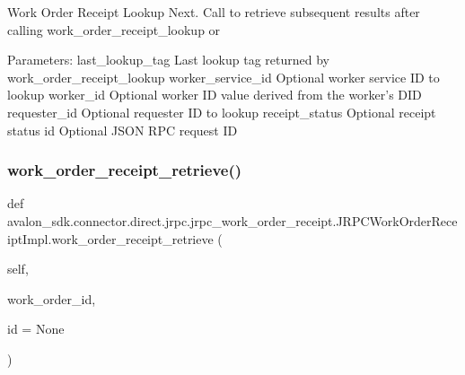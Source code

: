 \begin{DoxyVerb}Work Order Receipt Lookup Next.
Call to retrieve subsequent results after calling
work_order_receipt_lookup or

Parameters:
last_lookup_tag          Last lookup tag returned by
                 work_order_receipt_lookup
worker_service_id        Optional worker service ID to lookup
worker_id                Optional worker ID value derived from
                 the worker's DID
requester_id             Optional requester ID to lookup
receipt_status           Optional receipt status
id                       Optional JSON RPC request ID
\end{DoxyVerb}
 \mbox{\label{classavalon__sdk_1_1connector_1_1direct_1_1jrpc_1_1jrpc__work__order__receipt_1_1JRPCWorkOrderReceiptImpl_ad4a088c0a4999994ff61ae696b9b4c4c}} 
\subsubsection{\texorpdfstring{work\+\_\+order\+\_\+receipt\+\_\+retrieve()}{work\_order\_receipt\_retrieve()}}
{\footnotesize\ttfamily def avalon\+\_\+sdk.\+connector.\+direct.\+jrpc.\+jrpc\+\_\+work\+\_\+order\+\_\+receipt.\+J\+R\+P\+C\+Work\+Order\+Receipt\+Impl.\+work\+\_\+order\+\_\+receipt\+\_\+retrieve (\begin{DoxyParamCaption}\item[{}]{self,  }\item[{}]{work\+\_\+order\+\_\+id,  }\item[{}]{id = {\ttfamily None} }\end{DoxyParamCaption})}


